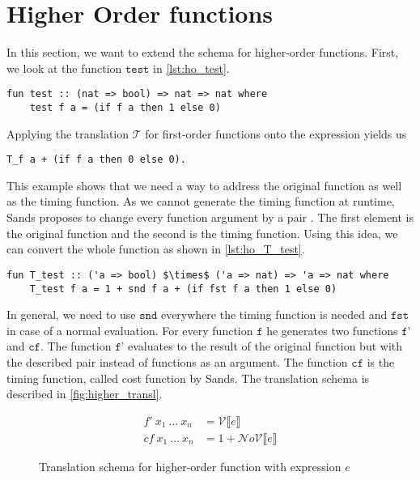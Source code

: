 
\section{Higher Order functions} \label{chapter:higher_order}

In this section, we want to extend the schema for higher-order functions.
First, we look at the function $\texttt{test}$ in \autoref{lst:ho_test}.
\begin{lstlisting}[language=isabelle,mathescape=true,label=lst:ho_test,caption=Example function]
  fun test :: (nat => bool) => nat => nat where
    test f a = (if f a then 1 else 0)
\end{lstlisting}
Applying the translation $\mathcal{T}$ for first-order functions onto the expression yields us
\begin{lstlisting}[language=isabelle,mathescape=true]
  T_f a + (if f a then 0 else 0).
\end{lstlisting}

This example shows that we need a way to address the original function as well as the timing function.
As we cannot generate the timing function at runtime, Sands proposes to change every function argument by a pair \parencite{sands}.
The first element is the original function and the second is the timing function.
Using this idea, we can convert the whole function as shown in \autoref{lst:ho_T_test}.
\begin{lstlisting}[language=isabelle,mathescape=true,label=lst:ho_T_test,caption=Timing function of example function]
  fun T_test :: ('a => bool) $\times$ ('a => nat) => 'a => nat where
    T_test f a = 1 + snd f a + (if fst f a then 1 else 0)
\end{lstlisting}
In general, we need to use $\texttt{snd}$ everywhere the timing function is needed and $\texttt{fst}$ in case of a normal evaluation.
For every function $\texttt{f}$ he generates two functions $\texttt{f'}$ and $\texttt{cf}$.
The function $\texttt{f'}$ evaluates to the result of the original function but with the described pair instead of functions as an argument.
The function $\texttt{cf}$ is the timing function, called cost function by Sands.
The translation schema is described in \autoref{fig:higher_transl}.
\begin{figure}
  \begin{align*}
  f'\ x_{1}\ \dots\ x_{n} &= \mathcal{V}\llbracket e \rrbracket \\
  cf\ x_{1}\ \dots\ x_{n} &= 1 + \mathcal{N}o\mathcal{V}\llbracket e \rrbracket
  \end{align*}
  \caption{Translation schema for higher-order function with expression $e$}
  \label{fig:higher_transl}
\end{figure}

